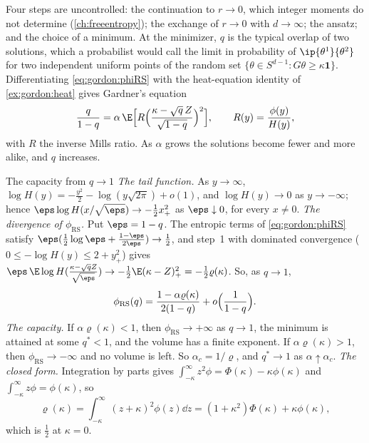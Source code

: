 \begin{refsection}
Four steps are uncontrolled: the continuation to $r\to0$, which integer moments do not determine (\cref{ch:freeentropy}); the exchange of $r\to0$ with $d\to\infty$; the ansatz; and the choice of a minimum. At the minimizer, $q$ is the typical overlap of two solutions, which a probabilist would call the limit in probability of $\ip{\theta^1}{\theta^2}$ for two independent uniform points of the random set $\{\theta\in S^{d-1}:G\theta\ge\kappa\mathbf 1\}$. Differentiating \eqref{eq:gordon:phiRS} with the heat-equation identity of \cref{ex:gordon:heat} gives Gardner's equation
\begin{equation}\label{eq:gordon:saddle}
\frac q{1-q}=\alpha\,\E\Bigl[R\Bigl(\frac{\kappa-\sqrt q\,Z}{\sqrt{1-q}}\Bigr)^2\Bigr],\qquad R(y)=\frac{\phi(y)}{H(y)},
\end{equation}
with $R$ the inverse Mills ratio. As $\alpha$ grows the solutions become fewer and more alike, and $q$ increases.

\begin{computation}{The capacity from $q\to1$}\label{comp:gordon:capacity}
\step \emph{The tail function.} As $y\to\infty$, $\log H(y)=-\frac{y^2}2-\log(y\sqrt{2\pi})+o(1)$, and $\log H(y)\to0$ as $y\to-\infty$; hence $\eps\log H(x/\sqrt\eps)\to-\frac12x_+^2$ as $\eps\downarrow0$, for every $x\ne0$.
\step \emph{The divergence of $\phi_{\mathrm{RS}}$.} Put $\eps=1-q$. The entropic terms of \eqref{eq:gordon:phiRS} satisfy $\eps(\frac12\log\eps+\frac{1-\eps}{2\eps})\to\frac12$, and step~1 with dominated convergence ($0\le-\log H(y)\le2+y_+^2$) gives $\eps\,\E\log H(\frac{\kappa-\sqrt qZ}{\sqrt\eps})\to-\frac12\E(\kappa-Z)_+^2=-\frac12\varrho(\kappa)$. So, as $q\to1$,
\[
\phi_{\mathrm{RS}}(q)=\frac{1-\alpha\varrho(\kappa)}{2(1-q)}+o\Bigl(\frac1{1-q}\Bigr).
\]
\step \emph{The capacity.} If $\alpha\varrho(\kappa)<1$, then $\phi_{\mathrm{RS}}\to+\infty$ as $q\to1$, the minimum is attained at some $q^*<1$, and the volume has a finite exponent. If $\alpha\varrho(\kappa)>1$, then $\phi_{\mathrm{RS}}\to-\infty$ and no volume is left. So $\alpha_c=1/\varrho$, and $q^*\to1$ as $\alpha\uparrow\alpha_c$.
\step \emph{The closed form.} Integration by parts gives $\int_{-\kappa}^\infty z^2\phi=\Phi(\kappa)-\kappa\phi(\kappa)$ and $\int_{-\kappa}^\infty z\phi=\phi(\kappa)$, so
\begin{equation}\label{eq:gordon:rho}
\varrho(\kappa)=\int_{-\kappa}^\infty(z+\kappa)^2\phi(z)\dd z=(1+\kappa^2)\Phi(\kappa)+\kappa\phi(\kappa),
\end{equation}
which is $\frac12$ at $\kappa=0$.
\end{computation}


\end{refsection}
